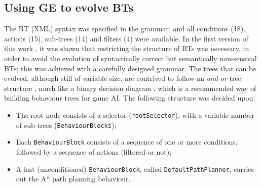 \documentclass[conference]{IEEEtran}
\begin{document}
\subsection{Using GE to evolve BTs} \label{subsec:incGE}

The BT (XML) syntax was specified in the grammar, and all
conditions (18), actions (15), sub-trees (14) and filters (4) were available.
%
In the first version of this work \cite{PNO11}, it was shown that restricting
the structure of BTs was necessary, in order to avoid the evolution of
syntactically correct but semantically non-sensical BTs; this was achieved with
a carefully designed grammar.
The trees that can
be evolved, although still of variable size, are contrived to follow
an \textit{and-or} tree structure \cite{Nil98}, much like a binary decision
diagram \cite{Ake78}, which is a recommended \cite{Cha07} way of building
behaviour trees for game AI.
The following structure was decided upon:
\begin{itemize}
	\item The root node consists of a selector (\texttt{rootSelector}),
		with a variable number of sub-trees (\texttt{BehaviourBlocks});
	\item Each \texttt{BehaviourBlock} consists of a sequence of one or
		more conditions, followed by a sequence of actions (filtered or
		not);
	\item A last (unconditioned) \texttt{BehaviourBlock}, called
		\texttt{DefaultPathPlanner}, carries out the A* path
		planning behaviour.
\end{itemize}
\end{document}
